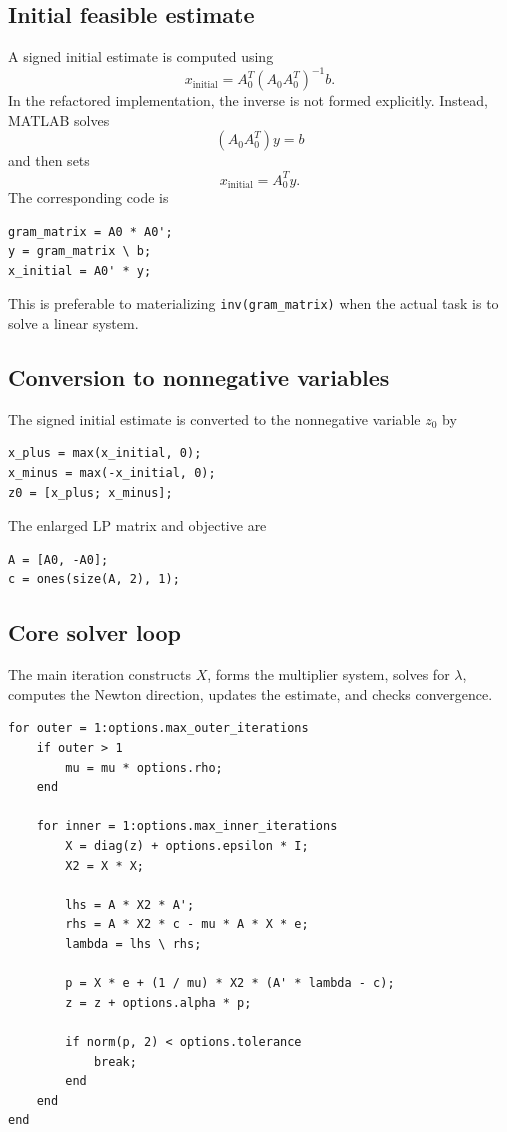 \documentclass[11pt]{article}
\begin{document}
\subsection{Initial feasible estimate}

A signed initial estimate is computed using
\[
x_{\text{initial}}
=
A_0^T(A_0A_0^T)^{-1}b.
\]
In the refactored implementation, the inverse is not formed explicitly. Instead, MATLAB solves
\[
(A_0A_0^T)y=b
\]
and then sets
\[
x_{\text{initial}}=A_0^Ty.
\]
The corresponding code is
\begin{lstlisting}[caption={Initialization using a linear solve.}]
gram_matrix = A0 * A0';
y = gram_matrix \ b;
x_initial = A0' * y;
\end{lstlisting}

This is preferable to materializing \texttt{inv(gram\_matrix)} when the actual task is to solve a linear system.

\subsection{Conversion to nonnegative variables}

The signed initial estimate is converted to the nonnegative variable $z_0$ by
\begin{lstlisting}[caption={Positive-negative decomposition of the initial estimate.}]
x_plus = max(x_initial, 0);
x_minus = max(-x_initial, 0);
z0 = [x_plus; x_minus];
\end{lstlisting}
The enlarged LP matrix and objective are
\begin{lstlisting}[caption={Linear-program construction.}]
A = [A0, -A0];
c = ones(size(A, 2), 1);
\end{lstlisting}

\subsection{Core solver loop}

The main iteration constructs $X$, forms the multiplier system, solves for $\lambda$, computes the Newton direction, updates the estimate, and checks convergence.

\begin{lstlisting}[caption={Core Interior Point iteration.}]
for outer = 1:options.max_outer_iterations
    if outer > 1
        mu = mu * options.rho;
    end

    for inner = 1:options.max_inner_iterations
        X = diag(z) + options.epsilon * I;
        X2 = X * X;

        lhs = A * X2 * A';
        rhs = A * X2 * c - mu * A * X * e;
        lambda = lhs \ rhs;

        p = X * e + (1 / mu) * X2 * (A' * lambda - c);
        z = z + options.alpha * p;

        if norm(p, 2) < options.tolerance
            break;
        end
    end
end
\end{lstlisting}
\end{document}
